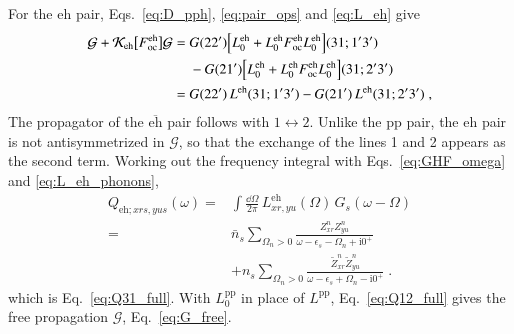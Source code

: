 \documentclass[aip,jcp,reprint,noshowkeys,superscriptaddress]{revtex4-1}
\newcommand{\cK}{\mathcal{K}}
\newcommand{\eps}{\epsilon}
\newcommand{\ii}{\mathrm{i}}
\newcommand{\eh}{\text{eh}}
\newcommand{\teh}{\overline{\text{eh}}}
\newcommand{\pp}{\text{pp}}
\begin{document}
For the $\eh$ pair,
Eqs.~\eqref{eq:D_pph}, \eqref{eq:pair_ops} and \eqref{eq:L_eh} give
\begin{equation}
\begin{aligned}
\mathcal G+\cK_{\eh}\big[F^{\eh}_{\rm oc}\big]\mathcal G
={}&
G(22')\Big[L^{\eh}_0
+L^{\eh}_0F^{\eh}_{\rm oc}L^{\eh}_0\Big](31;1'3')
\\
&-
G(21')\Big[L^{\eh}_0
+L^{\eh}_0F^{\eh}_{\rm oc}L^{\eh}_0\Big](31;2'3')
\\
={}&
G(22')\,L^{\eh}(31;1'3')
-
G(21')\,L^{\eh}(31;2'3') \;,
\end{aligned}
\label{eq:one_pair_eh}
\end{equation}
The propagator of the $\teh$ pair follows with $1\leftrightarrow2$.
Unlike the $\pp$ pair, the $\eh$ pair
is not antisymmetrized in $\mathcal G$, so that
the exchange of the lines 1 and 2 appears as the second term. 
Working out the frequency integral with Eqs.~\eqref{eq:GHF_omega} and
\eqref{eq:L_eh_phonons},
\begin{equation}
\begin{aligned}
Q_{\eh;xrs,yus}(\omega)
={}&
\int\frac{\dd\Omega}{2\pi}\,
L^{\eh}_{xr,yu}(\Omega)\,G_s(\omega-\Omega)
\\
={}&
\bar n_s\sum_{\Omega_n>0}
\frac{Z^n_{xr}Z^{n}_{yu}}{\omega-\eps_s-\Omega_n+\ii0^+}
\\
&+
n_s\sum_{\Omega_n>0}
\frac{\tilde Z^n_{xr}\tilde Z^{n}_{yu}}{\omega-\eps_s+\Omega_n-\ii0^+} \;.
\end{aligned}
\nonumber
\end{equation}
which is Eq.~\eqref{eq:Q31_full}.
With $L^{\pp}_0$ in place of $L^{\pp}$, Eq.~\eqref{eq:Q12_full} gives
the free propagation $\mathcal G$, Eq.~\eqref{eq:G_free}.

\end{document}
